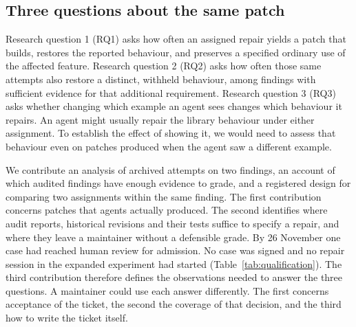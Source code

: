 \subsection{Three questions about the same patch}

Research question 1 (RQ1) asks how often an assigned repair yields a patch that builds, restores the reported behaviour, and preserves a specified ordinary use of the affected feature. Research question 2 (RQ2) asks how often those same attempts also restore a distinct, withheld behaviour, among findings with sufficient evidence for that additional requirement. Research question 3 (RQ3) asks whether changing which example an agent sees changes which behaviour it repairs. An agent might usually repair the library behaviour under either assignment. To establish the effect of showing it, we would need to assess that behaviour even on patches produced when the agent saw a different example.

We contribute an analysis of archived attempts on two findings, an account of which audited findings have enough evidence to grade, and a registered design for comparing two assignments within the same finding. The first contribution concerns patches that agents actually produced. The second identifies where audit reports, historical revisions and their tests suffice to specify a repair, and where they leave a maintainer without a defensible grade. By 26 November one case had reached human review for admission. No case was signed and no repair session in the expanded experiment had started (Table~\ref{tab:qualification}). The third contribution therefore defines the observations needed to answer the three questions. A maintainer could use each answer differently. The first concerns acceptance of the ticket, the second the coverage of that decision, and the third how to write the ticket itself.
